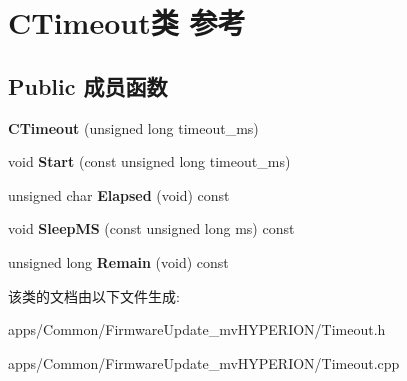 \hypertarget{class_c_timeout}{\section{C\+Timeout类 参考}
\label{class_c_timeout}
}
\subsection*{Public 成员函数}
\begin{DoxyCompactItemize}
\item 
\hypertarget{class_c_timeout_a3f20bb11967371c297c2416be638cb3d}{{\bfseries C\+Timeout} (unsigned long timeout\+\_\+ms)}\label{class_c_timeout_a3f20bb11967371c297c2416be638cb3d}

\item 
\hypertarget{class_c_timeout_a6f1dacedac4e804ddce1d3be7987036c}{void {\bfseries Start} (const unsigned long timeout\+\_\+ms)}\label{class_c_timeout_a6f1dacedac4e804ddce1d3be7987036c}

\item 
\hypertarget{class_c_timeout_a493e754b50027d53803b1be6e024b001}{unsigned char {\bfseries Elapsed} (void) const }\label{class_c_timeout_a493e754b50027d53803b1be6e024b001}

\item 
\hypertarget{class_c_timeout_aaeba980d8bab215054bb1056a7d19423}{void {\bfseries Sleep\+M\+S} (const unsigned long ms) const }\label{class_c_timeout_aaeba980d8bab215054bb1056a7d19423}

\item 
\hypertarget{class_c_timeout_ab9a3d3134fddc960b0041b9068e0317f}{unsigned long {\bfseries Remain} (void) const }\label{class_c_timeout_ab9a3d3134fddc960b0041b9068e0317f}

\end{DoxyCompactItemize}


该类的文档由以下文件生成\+:\begin{DoxyCompactItemize}
\item 
apps/\+Common/\+Firmware\+Update\+\_\+mv\+H\+Y\+P\+E\+R\+I\+O\+N/Timeout.\+h\item 
apps/\+Common/\+Firmware\+Update\+\_\+mv\+H\+Y\+P\+E\+R\+I\+O\+N/Timeout.\+cpp\end{DoxyCompactItemize}
